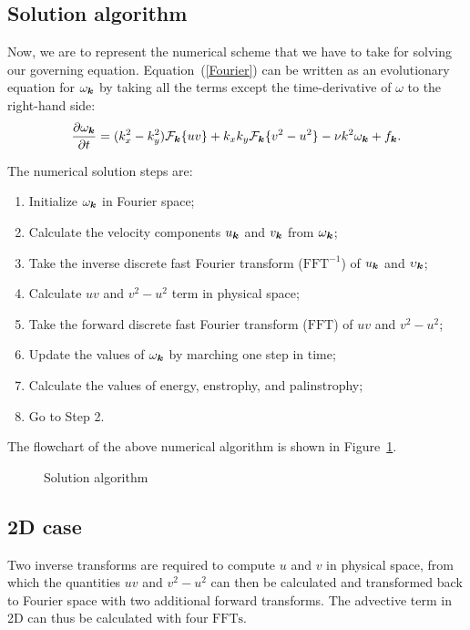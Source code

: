 \documentclass[12pt]{article}
\def\Eq#1{(\ref{#1})}
\begin{document}
\subsection{Solution algorithm}
Now, we are to represent the numerical scheme that we have to take for solving our governing equation. 
Equation~\Eq{Fourier} can be written as an evolutionary equation for $\omega_{\bm k}$ by taking all the terms except the time-derivative of $\omega$ to the right-hand side:
\begin{equation}\label{evolutionary}
  \frac{\partial\omega_{{\bm k}}}{\partial t} =
  (k_x^2-k_y^2) {\mathcal F}_{\bm k}\{uv\}+k_xk_y{\mathcal F}_{\bm k}\{v^2-u^2\} -\nu k^2\omega_{{\bm k}} + f_{{\bm k}}.
\end{equation}

\pagebreak[4]
The numerical solution steps are:
\begin{enumerate}
\item Initialize $\omega_{{\bm k}}$ in Fourier space;
\item Calculate the velocity components $u_{\bm k}$ and $v_{\bm k}$ from $\omega_{{\bm k}}$;
\item Take the inverse discrete fast Fourier transform
  ($\text{FFT}^{-1}$) of $u_{\bm k}$ and $\upsilon_{\bm k}$;
\item Calculate $uv$ and $v^2-u^2$ term in physical space;
\item Take the forward discrete fast Fourier transform ($\text{FFT}$) of
$uv$ and $v^2-u^2$;
\item Update the values of $\omega_{\bm k}$ by marching one step in time;
\item Calculate the values of energy, enstrophy, and palinstrophy;
\item Go to Step 2.
\end{enumerate}
The flowchart of the above numerical algorithm is shown in Figure~\ref{algorithm}.
\begin{figure}[ht]
\begin{center}
\caption{Solution algorithm}\label{algorithm}
\end{center}
\end{figure}
\subsection{2D case}
Two inverse transforms are required to compute $u$ and $v$ in physical
space, from which the quantities $uv$ and $v^2-u^2$ can then be
calculated and transformed back to Fourier space with two additional
forward transforms. The advective term in 2D can thus be calculated with four $\text{FFTs}$.

\hypertarget{Bibliography}{}


\hypertarget{Index}{}
\printindex
\end{document}

